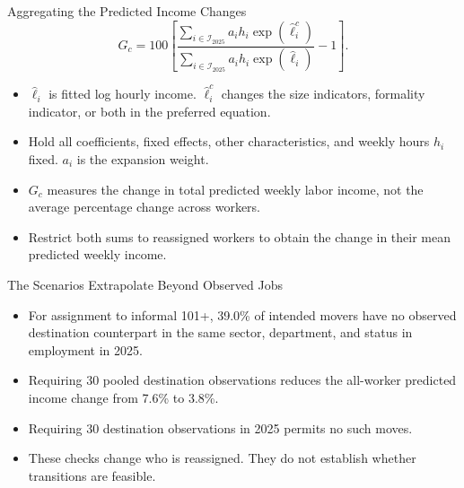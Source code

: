 \begin{frame}{Aggregating the Predicted Income Changes}
  \small
  \[
  G_c=100\left[\frac{\sum_{i\in\mathcal I_{2025}} a_i h_i\exp(\widehat\ell_i^c)}
                         {\sum_{i\in\mathcal I_{2025}} a_i h_i\exp(\widehat\ell_i)}-1\right].
  \]
  \begin{itemize}
    \item $\widehat\ell_i$ is fitted log hourly income. $\widehat\ell_i^c$ changes the size indicators, formality indicator, or both in the preferred equation.
    \item Hold all coefficients, fixed effects, other characteristics, and weekly hours $h_i$ fixed. $a_i$ is the expansion weight.
    \item $G_c$ measures the change in total predicted weekly labor income, not the average percentage change across workers.
    \item Restrict both sums to reassigned workers to obtain the change in their mean predicted weekly income.
  \end{itemize}
\end{frame}

\begin{frame}{The Scenarios Extrapolate Beyond Observed Jobs}
  \begin{itemize}
    \item For assignment to informal 101+, 39.0\% of intended movers have no observed destination counterpart in the same sector, department, and status in employment in 2025.
    \item Requiring 30 pooled destination observations reduces the all-worker predicted income change from 7.6\% to 3.8\%.
    \item Requiring 30 destination observations in 2025 permits no such moves.
    \item These checks change who is reassigned. They do not establish whether transitions are feasible.
  \end{itemize}
\end{frame}

